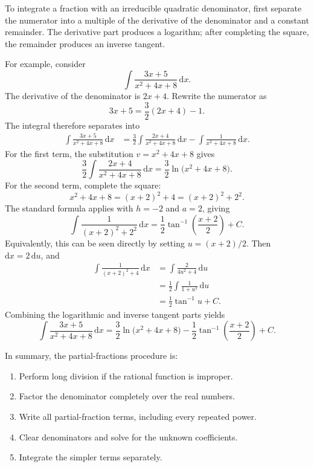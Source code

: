To integrate a fraction with an irreducible quadratic denominator, first
separate the numerator into a multiple of the derivative of the denominator
and a constant remainder.  The derivative part produces a logarithm; after
completing the square, the remainder produces an inverse tangent.

For example, consider
\[
    \int\frac{3x+5}{x^2+4x+8}\,\mathrm{d}x.
\]
The derivative of the denominator is \(2x+4\).  Rewrite the numerator as
\[
    3x+5=\frac32(2x+4)-1.
\]
The integral therefore separates into
\begin{align*}
    \int\frac{3x+5}{x^2+4x+8}\,\mathrm{d}x
    &=\frac32\int\frac{2x+4}{x^2+4x+8}\,\mathrm{d}x
      -\int\frac{1}{x^2+4x+8}\,\mathrm{d}x.
\end{align*}
For the first term, the substitution
\(v=x^2+4x+8\) gives
\[
    \frac32\int\frac{2x+4}{x^2+4x+8}\,\mathrm{d}x
    =\frac32\ln\bigl(x^2+4x+8\bigr).
\]
For the second term, complete the square:
\[
    x^2+4x+8=(x+2)^2+4=(x+2)^2+2^2.
\]
The standard formula applies with \(h=-2\) and \(a=2\), giving
\[
    \int\frac{1}{(x+2)^2+2^2}\,\mathrm{d}x
    =\frac12\tan^{-1}\!\left(\frac{x+2}{2}\right)+C.
\]
Equivalently, this can be seen directly by setting
\(u=(x+2)/2\).  Then \(\mathrm{d}x=2\,\mathrm{d}u\), and
\begin{align*}
    \int\frac{1}{(x+2)^2+4}\,\mathrm{d}x
    &=\int\frac{2}{4u^2+4}\,\mathrm{d}u \\
    &=\frac12\int\frac{1}{1+u^2}\,\mathrm{d}u \\
    &=\frac12\tan^{-1}u+C.
\end{align*}
Combining the logarithmic and inverse tangent parts yields
\[
    \boxed{
        \int\frac{3x+5}{x^2+4x+8}\,\mathrm{d}x
        =\frac32\ln\bigl(x^2+4x+8\bigr)
         -\frac12\tan^{-1}\!\left(\frac{x+2}{2}\right)+C
    }.
\]

In summary, the partial-fractions procedure is:
\begin{enumerate}
    \item Perform long division if the rational function is improper.
    \item Factor the denominator completely over the real numbers.
    \item Write all partial-fraction terms, including every repeated power.
    \item Clear denominators and solve for the unknown coefficients.
    \item Integrate the simpler terms separately.
\end{enumerate}

